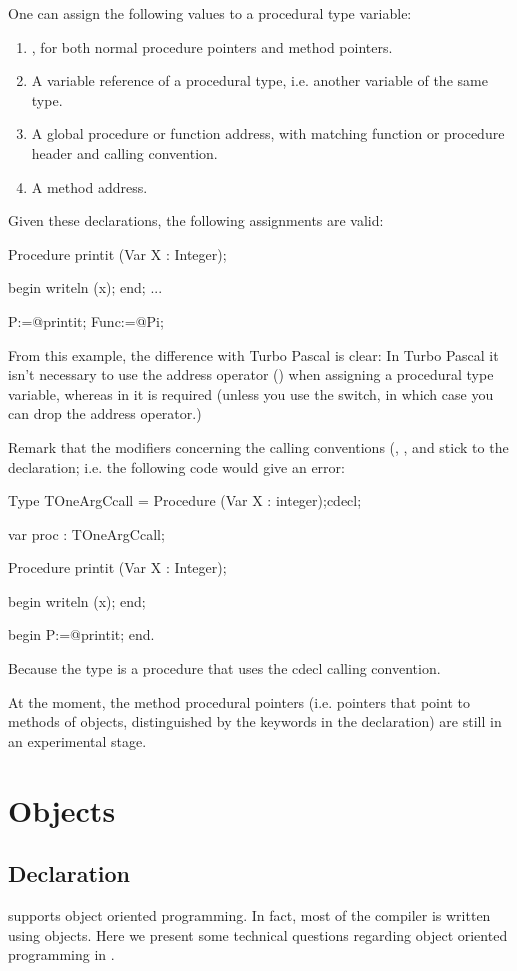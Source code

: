 \documentclass{report}
\begin{document}
One can assign the following values to a procedural type variable:
\begin{enumerate}
\item {}, for both normal procedure pointers and method pointers.
\item A variable reference of a procedural type, i.e. another variable of
the same type.
\item A global procedure or function address, with matching function or
procedure header and calling convention.
\item A method address.
\end{enumerate}

Given these declarations, the following assignments are valid:
\begin{listing}
Procedure printit (Var X : Integer);

begin
  writeln (x);
end;
...

P:=@printit;
Func:=@Pi;
\end{listing}
From this example, the difference with Turbo Pascal is clear: In Turbo
Pascal it isn't necessary to use the address operator () 
when assigning a procedural type variable, whereas in \fpc it is required
(unless you use the  switch, in which case you can drop the address
operator.)

Remark that the modifiers concerning the calling conventions (,
,  and  stick to the declaration;
i.e. the following code would give an error:
\begin{listing}
Type TOneArgCcall = Procedure (Var X : integer);cdecl;

var proc : TOneArgCcall;

Procedure printit (Var X : Integer);

begin
  writeln (x);
end;

begin
P:=@printit;
end.
\end{listing}
Because the  type is a procedure that uses the cdecl
calling convention. 

At the moment, the method procedural pointers (i.e. pointers that point to
methods of objects, distinguished by the  keywords in the
declaration) are still in an experimental stage.

\chapter{Objects}

\section{Declaration}
\fpc supports object oriented programming. In fact, most  of the compiler is
written using objects. Here we present some technical questions regarding
object oriented programming in \fpc.
\end{document}
